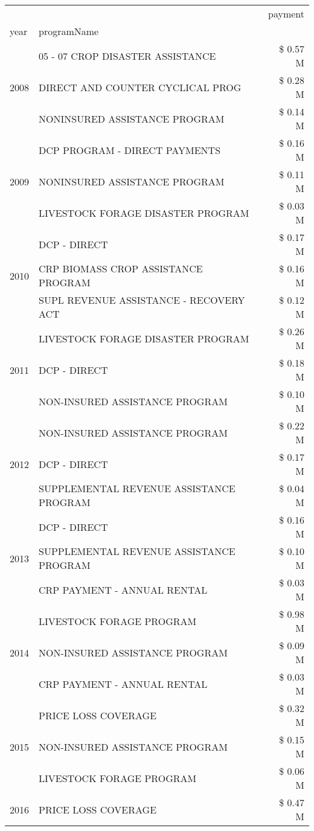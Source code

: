 \begin{tabular}{llr}
\toprule
 &  & payment \\
year & programName &  \\
\midrule
\multirow[t]{3}{*}{2008} & 05 - 07 CROP DISASTER ASSISTANCE & \$ 0.57 M \\
 & DIRECT AND COUNTER CYCLICAL PROG & \$ 0.28 M \\
 & NONINSURED ASSISTANCE PROGRAM & \$ 0.14 M \\
\cline{1-3}
\multirow[t]{3}{*}{2009} & DCP PROGRAM - DIRECT PAYMENTS & \$ 0.16 M \\
 & NONINSURED ASSISTANCE PROGRAM & \$ 0.11 M \\
 & LIVESTOCK FORAGE DISASTER  PROGRAM & \$ 0.03 M \\
\cline{1-3}
\multirow[t]{3}{*}{2010} & DCP - DIRECT & \$ 0.17 M \\
 & CRP BIOMASS CROP ASSISTANCE PROGRAM & \$ 0.16 M \\
 & SUPL REVENUE ASSISTANCE - RECOVERY ACT & \$ 0.12 M \\
\cline{1-3}
\multirow[t]{3}{*}{2011} & LIVESTOCK FORAGE DISASTER PROGRAM & \$ 0.26 M \\
 & DCP - DIRECT & \$ 0.18 M \\
 & NON-INSURED ASSISTANCE PROGRAM & \$ 0.10 M \\
\cline{1-3}
\multirow[t]{3}{*}{2012} & NON-INSURED ASSISTANCE PROGRAM & \$ 0.22 M \\
 & DCP - DIRECT & \$ 0.17 M \\
 & SUPPLEMENTAL REVENUE ASSISTANCE PROGRAM & \$ 0.04 M \\
\cline{1-3}
\multirow[t]{3}{*}{2013} & DCP - DIRECT & \$ 0.16 M \\
 & SUPPLEMENTAL REVENUE ASSISTANCE PROGRAM & \$ 0.10 M \\
 & CRP PAYMENT - ANNUAL RENTAL & \$ 0.03 M \\
\cline{1-3}
\multirow[t]{3}{*}{2014} & LIVESTOCK FORAGE PROGRAM & \$ 0.98 M \\
 & NON-INSURED ASSISTANCE PROGRAM & \$ 0.09 M \\
 & CRP PAYMENT - ANNUAL RENTAL & \$ 0.03 M \\
\cline{1-3}
\multirow[t]{3}{*}{2015} & PRICE LOSS COVERAGE & \$ 0.32 M \\
 & NON-INSURED ASSISTANCE PROGRAM & \$ 0.15 M \\
 & LIVESTOCK FORAGE PROGRAM & \$ 0.06 M \\
\cline{1-3}
\multirow[t]{3}{*}{2016} & PRICE LOSS COVERAGE & \$ 0.47 M \\

\end{tabular}
